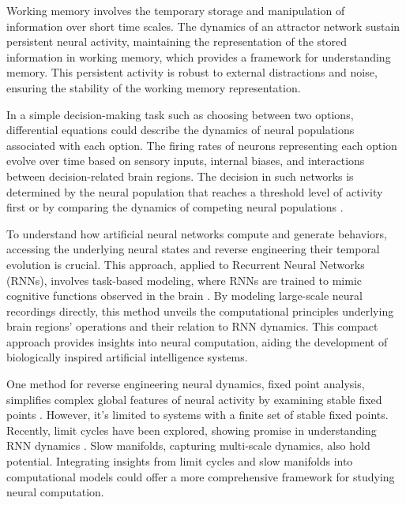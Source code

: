 \documentclass[12pt,letterpaper, onecolumn]{article}
\theoremstyle{definition}
\theoremstyle{remark}
\begin{document}
Working memory involves the temporary storage and manipulation of information over short time scales. The dynamics of an attractor network sustain persistent neural activity, maintaining the representation of the stored information in working memory, which provides a framework for understanding memory. This persistent activity is robust to external distractions and noise, ensuring the stability of the working memory representation.

In a simple decision-making task such as choosing between two options, differential equations could describe the dynamics of neural populations associated with each option. The firing rates of neurons representing each option evolve over time based on sensory inputs, internal biases, and interactions between decision-related brain regions. The decision in such networks is determined by the neural population that reaches a threshold level of activity first or by comparing the dynamics of competing neural populations \citep{wong2007, wong2008}.


To understand how artificial neural networks compute and generate behaviors, accessing the underlying neural states and reverse engineering their temporal evolution is crucial. This approach, applied to Recurrent Neural Networks (RNNs), involves task-based modeling, where RNNs are trained to mimic cognitive functions observed in the brain \citep{darshan2020, barak2017recurrent}. By modeling large-scale neural recordings directly, this method unveils the computational principles underlying brain regions' operations and their relation to RNN dynamics. This compact approach provides insights into neural computation, aiding the development of biologically inspired artificial intelligence systems.


One method for reverse engineering neural dynamics, fixed point analysis, simplifies complex global features of neural activity by examining stable fixed points \citep{sussillo2014}. However, it's limited to systems with a finite set of stable fixed points. Recently, limit cycles have been explored, showing promise in understanding RNN dynamics \citep{pals2014}. Slow manifolds, capturing multi-scale dynamics, also hold potential. Integrating insights from limit cycles and slow manifolds into computational models could offer a more comprehensive framework for studying neural computation.
\end{document}
